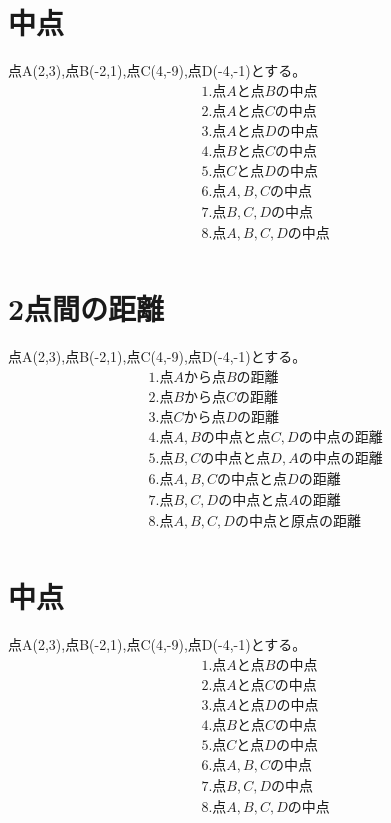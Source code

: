 \documentclass[paper=b4j,landscape,twocolumn,fleqn]{jlreq}
\begin{document}
\section{中点}
点A(2,3),点B(-2,1),点C(4,-9),点D(-4,-1)とする。
\begin{align*}
　&1.　点Aと点Bの中点\\[1em]
　&2.　点Aと点Cの中点\\[1em]
　&3.　点Aと点Dの中点\\[1em]
　&4.　点Bと点Cの中点\\[1em]
　&5.　点Cと点Dの中点\\[1em]
　&6.　点A,B,Cの中点\\[1em]
　&7.　点B,C,Dの中点\\[1em]
　&8.　点A,B,C,Dの中点\\[1em]
\end{align*}
\section{2点間の距離}
点A(2,3),点B(-2,1),点C(4,-9),点D(-4,-1)とする。
\begin{align*}
　&1.　点Aから点Bの距離\\[1em]
　&2.　点Bから点Cの距離\\[1em]
　&3.　点Cから点Dの距離\\[1em]
　&4.　点A,Bの中点と点C,Dの中点の距離\\[1em]
　&5.　点B,Cの中点と点D,Aの中点の距離\\[1em]
　&6.　点A,B,Cの中点と点Dの距離\\[1em]
　&7.　点B,C,Dの中点と点Aの距離\\[1em]
　&8.　点A,B,C,Dの中点と原点の距離\\[1em]
\end{align*}

\newpage
\section{中点}
点A(2,3),点B(-2,1),点C(4,-9),点D(-4,-1)とする。
\begin{align*}
　&1.　点Aと点Bの中点\\[1em]
　&2.　点Aと点Cの中点\\[1em]
　&3.　点Aと点Dの中点\\[1em]
　&4.　点Bと点Cの中点\\[1em]
　&5.　点Cと点Dの中点\\[1em]
　&6.　点A,B,Cの中点\\[1em]
　&7.　点B,C,Dの中点\\[1em]
　&8.　点A,B,C,Dの中点\\[1em]
\end{align*}
\end{document}
